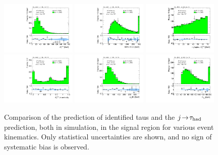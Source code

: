 \begin{figure}[tp]
  \includegraphics[width=0.32\textwidth]{figures/analysis/vbf-MCXSR/met-pt-hi}
  \includegraphics[width=0.32\textwidth]{figures/analysis/vbf-MCXSR/mMMC}
  \includegraphics[width=0.32\textwidth]{figures/analysis/vbf-MCXSR/mT} \\
  \includegraphics[width=0.32\textwidth]{figures/analysis/vbf-MCXSR/met-phi-centrality}
  \includegraphics[width=0.32\textwidth]{figures/analysis/vbf-MCXSR/H-pt-hi}
  \includegraphics[width=0.32\textwidth]{figures/analysis/vbf-MCXSR/mvis} \\
  \caption{Comparison of the prediction of identified taus and the $j\!\rightarrow\!\tau_\text{had}$ prediction, both in simulation, in the signal region for various event kinematics. Only statistical uncertainties are shown, and no sign of systematic bias is observed.}
  \label{fig:backgrounds-MCXSR-taus}
\end{figure}

